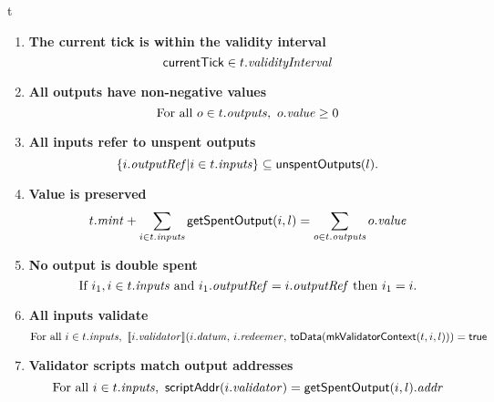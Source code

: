 \begin{ruledfigure}{t}
\begin{enumerate}

\item
  \label{rule:slot-in-range}
  \textbf{The current tick is within the validity interval}
  \begin{displaymath}
    \mathsf{currentTick} \in t.\textit{validityInterval}
  \end{displaymath}

\item
  \label{rule:all-outputs-are-non-negative}
  \textbf{All outputs have non-negative values}
  \begin{displaymath}
    \textrm{For all } o \in t.\mathit{outputs},\ o.\mathit{value} \geq 0
  \end{displaymath}

\item
  \label{rule:all-inputs-refer-to-unspent-outputs}
  \textbf{All inputs refer to unspent outputs}
  \begin{displaymath}
    \{i.\mathit{outputRef} | i \in t.\mathit{inputs} \} \subseteq \mathsf{unspentOutputs}(l).
  \end{displaymath}

\item
  \label{rule:value-is-preserved}
  \textbf{Value is preserved}
  \begin{displaymath}
    t.\mathit{mint} + \sum_{i \in t.\mathit{inputs}} \mathsf{getSpentOutput}(i, l) = \sum_{o \in t.\mathit{outputs}} o.\mathit{value}
  \end{displaymath}

\item
  \label{rule:no-double-spending}
  \textbf{No output is double spent}
  \begin{displaymath}
    \textrm{If } i_1, i \in t.\mathit{inputs} \textrm{ and }  i_1.\mathit{outputRef} = i.\mathit{outputRef}
    \textrm{ then } i_1 = i.
  \end{displaymath}

\item
  \label{rule:all-inputs-validate}
  \textbf{All inputs validate}
  \begin{displaymath}
    \textrm{For all } i \in t.\mathit{inputs},\ \llbracket i.\mathit{validator}\rrbracket(i.\mathit{datum},\, i.\mathit{redeemer},\, \textsf{toData}(\textsf{mkValidatorContext}(t, i, l))) = \mathsf{true}
  \end{displaymath}

\item
  \label{rule:validator-scripts-hash}
  \textbf{Validator scripts match output addresses}
  \begin{displaymath}
    \textrm{For all } i \in t.\mathit{inputs},\ \mathsf{scriptAddr}(i.\mathit{validator}) = \mathsf{getSpentOutput}(i, l).\mathit{addr}
  \end{displaymath}


\end{enumerate}
\end{ruledfigure}
